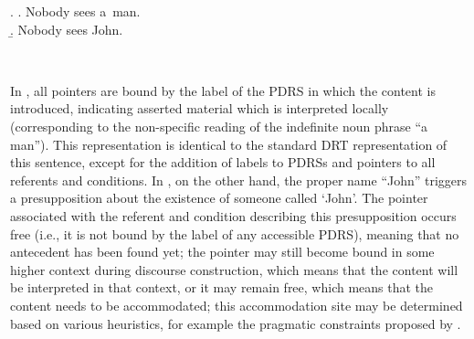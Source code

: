 \begin{flushleft}
\begin{minipage}{0.9\linewidth}
  \begin{multicols}{2}
\ex. \a. Nobody sees a~man.\\
\b. Nobody sees John.\\

\end{multicols}
\end{minipage}\\
\end{flushleft}

\noindent In \Last[a], all pointers are bound by the label of the PDRS in
which the content is introduced, indicating asserted material which is
interpreted locally (corresponding to the non-specific reading of the
indefinite noun phrase ``a man'').  This representation is identical to the
standard DRT representation of this sentence, except for the addition of
labels to PDRSs and pointers to all referents and conditions. In \Last[b],
on the other hand, the proper name ``John'' triggers a presupposition about
the existence of someone called `John'.  The pointer associated with the
referent and condition describing this presupposition occurs free (i.e., it
is not bound by the label of any accessible PDRS), meaning that no
antecedent has been found yet; the pointer may still become bound in some
higher context during discourse construction, which means that the content
will be interpreted in that context, or it may remain free, which means that
the content needs to be accommodated; this accommodation site may be
determined based on various heuristics, for example the pragmatic constraints proposed by
\cite{sandt1992presupposition}.

